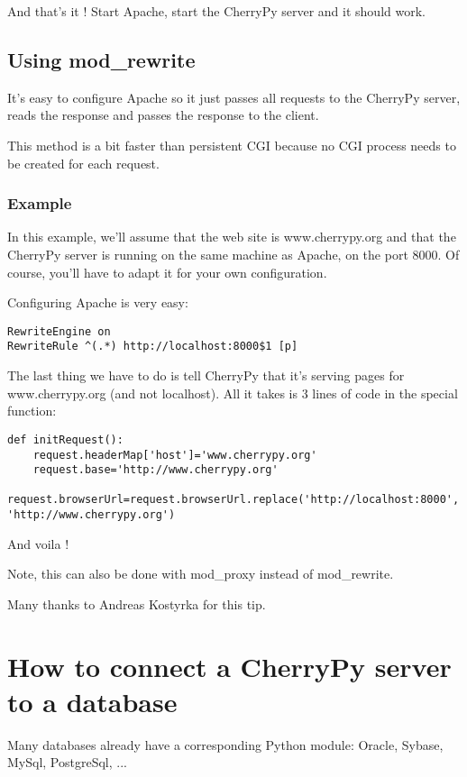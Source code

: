 \documentclass{manual}
\begin{document}
And that's it ! Start Apache, start the CherryPy server and it should work.

\begin{seealso}
\end{seealso}

\section{Using mod_rewrite}

It's easy to configure Apache so it just passes all requests to the CherryPy server, reads the response and
passes the response to the client.

This method is a bit faster than persistent CGI because no CGI process needs to be created for each request.

\subsection{Example}
In this example, we'll assume that the web site is www.cherrypy.org and that the CherryPy server is running
on the same machine as Apache, on the port 8000. Of course, you'll have to adapt it for your own configuration.

Configuring Apache is very easy:
\begin{verbatim}
RewriteEngine on
RewriteRule ^(.*) http://localhost:8000$1 [p]
\end{verbatim}

The last thing we have to do is tell CherryPy that it's serving pages for www.cherrypy.org (and not localhost).
All it takes is 3 lines of code in the  special function:

\begin{verbatim}
def initRequest():
    request.headerMap['host']='www.cherrypy.org'
    request.base='http://www.cherrypy.org'
    request.browserUrl=request.browserUrl.replace('http://localhost:8000', 'http://www.cherrypy.org')
\end{verbatim}

And voila !

Note, this can also be done with mod_proxy instead of mod_rewrite.

Many thanks to Andreas Kostyrka for this tip.


\chapter{How to connect a CherryPy server to a database}
Many databases already have a corresponding Python module: Oracle, Sybase, MySql, PostgreSql, ...
\end{document}
